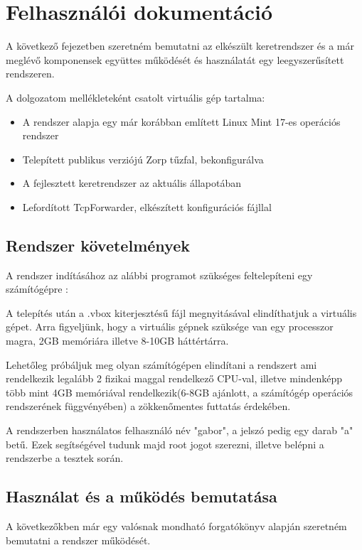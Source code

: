 \documentclass[a4paper,12pt,oneside]{report}
\begin{document}
\section{Felhasználói dokumentáció}

A következő fejezetben szeretném bemutatni az elkészült keretrendszer és a már meglévő komponensek együttes működését és használatát egy leegyszerűsített rendszeren.

A dolgozatom mellékleteként csatolt virtuális gép tartalma:
\begin{itemize}
    \itemsep0em
        \item A rendszer alapja egy már korábban említett Linux Mint 17-es operációs rendszer
        \item Telepített publikus verziójú Zorp tűzfal, bekonfigurálva
        \item A fejlesztett keretrendszer az aktuális állapotában
        \item Lefordított TcpForwarder, elkészített konfigurációs fájllal
\end{itemize}

\subsection{Rendszer követelmények}

A rendszer indításához az alábbi programot szükséges feltelepíteni egy számítógépre : \cite{website:vbox}

A telepítés után a .vbox kiterjesztésű fájl megnyitásával elindíthatjuk a virtuális gépet.
Arra figyeljünk, hogy a virtuális gépnek szüksége van egy processzor magra, 2GB memóriára illetve 8-10GB háttértárra.

Lehetőleg próbáljuk meg olyan számítógépen elindítani a rendszert ami rendelkezik legalább 2 fizikai maggal rendelkező CPU-val, illetve mindenképp több mint 4GB memóriával rendelkezik(6-8GB ajánlott, a számítógép operációs rendszerének függvényében) a zökkenőmentes futtatás érdekében.

A rendszerben használatos felhasználó név "gabor", a jelszó pedig egy darab "a" betű. Ezek segítségével tudunk majd root jogot szerezni, illetve belépni a rendszerbe a tesztek során.

\subsection{Használat és a működés bemutatása}

A következőkben már egy valósnak mondható forgatókönyv alapján szeretném bemutatni a rendszer működését.
\end{document}
